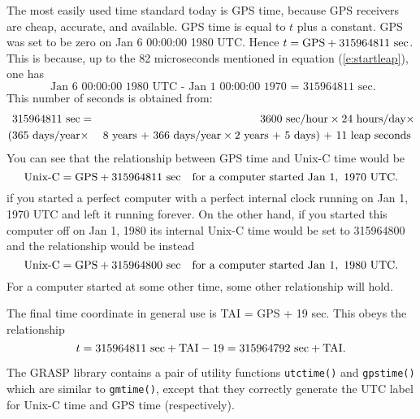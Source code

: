 The most easily used time standard today is GPS time, because GPS
receivers are cheap, accurate, and available.  GPS time is equal to $t$
plus a constant.  GPS was set to be zero on Jan 6 00:00:00 1980 UTC.
Hence $t = \textrm{GPS} + 315964811 \  {\rm sec}$.
This is because, up to the 82 microseconds mentioned in equation (\ref{e:startleap}),
one has
\begin{equation}
\textrm{ Jan 6 00:00:00 1980 UTC - Jan 1 00:00:00 1970 = 315964811 sec.}
\end{equation}
This number of seconds is obtained from:
\begin{eqnarray}
\nonumber
\textrm{
315964811 sec} & = & 
\textrm{3600 sec/hour} \times \textrm{24 hours/day} \times  \\
\textrm{(365 days/year} & \times & \textrm{8 years + 366 days/year} \times \textrm{2 years + 5 days) + 11 leap seconds \hfil
}
\end{eqnarray}
You can see that the relationship between GPS time and Unix-C time would be
\begin{equation}
\textrm{Unix-C} = \textrm{GPS} + 315964811 \ \rm{sec} \quad \rm{for\ a\ computer\ started\ Jan\ 1,\ 1970\ UTC}.
\end{equation}
if you started a perfect computer with a perfect internal clock running on Jan 1, 1970 UTC and left
it running forever.  On the other hand, if you started this computer
off on Jan 1, 1980 its internal Unix-C time would be set to 315964800 and the relationship would
be instead 
\begin{equation}
\textrm{Unix-C} = \textrm{GPS} + 315964800 \ \rm{sec} \quad \rm{for\ a\ computer\ started\ Jan\ 1,\ 1980\ UTC}.
\end{equation}
For a computer started at some other time, some other relationship will hold.

The final time coordinate in general use is TAI = GPS + 19 sec.  This obeys the relationship
\begin{equation}
t = 315964811 \  {\rm sec} + \textrm{TAI} - 19 = 315964792\  {\rm sec} + \textrm{TAI}.
\end{equation}

The GRASP library contains a pair of utility functions {\tt utctime()}
and {\tt gpstime()} which are similar to {\tt gmtime()}, except that
they correctly generate the UTC label for Unix-C time and GPS time
(respectively).

